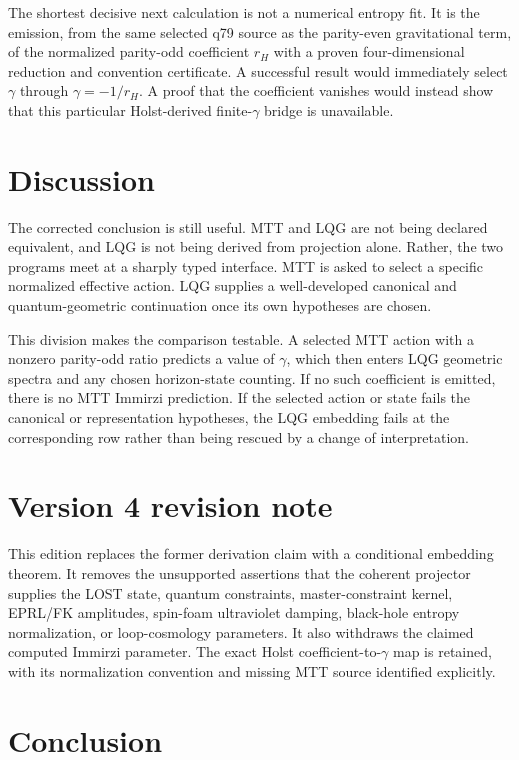 \documentclass[11pt]{article}
\theoremstyle{plain}
\begin{document}
The shortest decisive next calculation is not a numerical entropy fit. It is
the emission, from the same selected q79 source as the parity-even
gravitational term, of the normalized parity-odd coefficient \(r_H\) with a
proven four-dimensional reduction and convention certificate. A successful
result would immediately select \(\gamma\) through
\(\gamma=-1/r_H\). A proof that the coefficient vanishes would instead show
that this particular Holst-derived finite-\(\gamma\) bridge is unavailable.

\section{Discussion}

The corrected conclusion is still useful. MTT and LQG are not being declared
equivalent, and LQG is not being derived from projection alone. Rather, the
two programs meet at a sharply typed interface. MTT is asked to select a
specific normalized effective action. LQG supplies a well-developed
canonical and quantum-geometric continuation once its own hypotheses are
chosen.

This division makes the comparison testable. A selected MTT action with a
nonzero parity-odd ratio predicts a value of \(\gamma\), which then enters
LQG geometric spectra and any chosen horizon-state counting. If no such
coefficient is emitted, there is no MTT Immirzi prediction. If the selected
action or state fails the canonical or representation hypotheses, the LQG
embedding fails at the corresponding row rather than being rescued by a
change of interpretation.

\section{Version 4 revision note}

This edition replaces the former derivation claim with a conditional
embedding theorem. It removes the unsupported assertions that the coherent
projector supplies the LOST state, quantum constraints, master-constraint
kernel, EPRL/FK amplitudes, spin-foam ultraviolet damping, black-hole entropy
normalization, or loop-cosmology parameters. It also withdraws the claimed
computed Immirzi parameter. The exact Holst coefficient-to-\(\gamma\) map is
retained, with its normalization convention and missing MTT source identified
explicitly.

\section{Conclusion}
\end{document}
